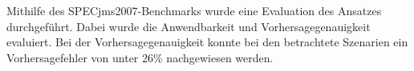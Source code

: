 Mithilfe des SPECjms2007-Benchmarks wurde eine Evaluation des Ansatzes durchgeführt. Dabei wurde die Anwendbarkeit und Vorhersagegenauigkeit evaluiert. Bei der Vorhersagegenauigkeit konnte bei den betrachtete Szenarien ein Vorhersagefehler von unter 26\% nachgewiesen werden.
